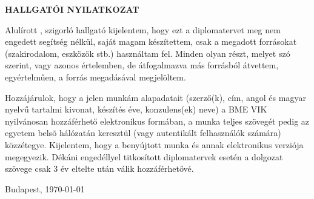 \begin{center}
\large
\textbf{HALLGATÓI NYILATKOZAT}\\
\end{center}

Alulírott \emph{\vikszerzo}, szigorló hallgató kijelentem, hogy ezt a diplomatervet meg nem engedett segítség nélkül, saját magam
készítettem, csak a megadott forrásokat (szakirodalom, eszközök stb.) használtam fel.
Minden olyan részt, melyet szó szerint, vagy azonos értelemben, de átfogalmazva más forrásból átvettem, egyértelműen, a forrás
megadásával megjelöltem.

Hozzájárulok, hogy a jelen munkám alapadatait (szerző(k), cím, angol és magyar nyelvű tartalmi kivonat, készítés éve,
konzulens(ek) neve) a BME VIK nyilvánosan hozzáférhető elektronikus formában,
a munka teljes szövegét pedig az egyetem belsõ hálózatán keresztül (vagy autentikált felhasználók számára) közzétegye.
Kijelentem, hogy a benyújtott munka és annak elektronikus verziója megegyezik.
Dékáni engedéllyel titkosított diplomatervek esetén a dolgozat szövege csak 3 év eltelte után válik hozzáférhetővé.

\begin{flushleft}
\vspace*{1cm}
Budapest, \today
\end{flushleft}

\begin{flushright}
 \vspace*{1cm}
 \makebox[7cm]{\rule{6cm}{.4pt}}\\
 \makebox[7cm]{\emph{\vikszerzo}}\\
\end{flushright}

\vfill

